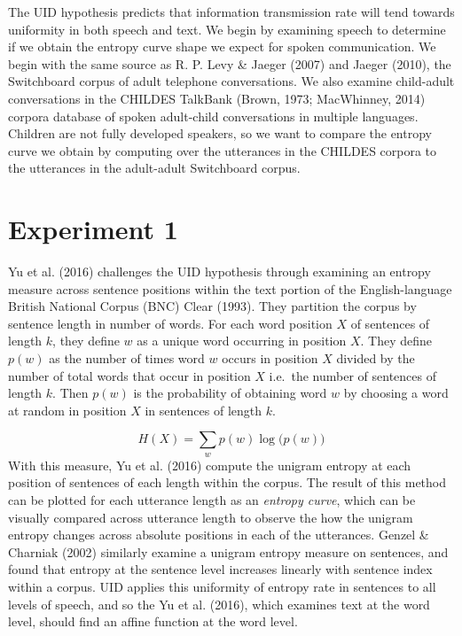 \documentclass[10pt, letterpaper]{article}
\begin{document}
The UID hypothesis predicts that information transmission rate will tend
towards uniformity in both speech and text. We begin by examining speech
to determine if we obtain the entropy curve shape we expect for spoken
communication. We begin with the same source as R. P. Levy \& Jaeger
(2007) and Jaeger (2010), the Switchboard corpus of adult telephone
conversations. We also examine child-adult conversations in the CHILDES
TalkBank (Brown, 1973; MacWhinney, 2014) corpora database of spoken
adult-child conversations in multiple languages. Children are not fully
developed speakers, so we want to compare the entropy curve we obtain by
computing over the utterances in the CHILDES corpora to the utterances
in the adult-adult Switchboard corpus.

\section{Experiment 1}\label{experiment-1}

Yu et al. (2016) challenges the UID hypothesis through examining an
entropy measure across sentence positions within the text portion of the
English-language British National Corpus (BNC) Clear (1993). They
partition the corpus by sentence length in number of words. For each
word position \(X\) of sentences of length \(k\), they define \(w\) as a
unique word occurring in position \(X\). They define \(p(w)\) as the
number of times word \(w\) occurs in position \(X\) divided by the
number of total words that occur in position \(X\) i.e.~the number of
sentences of length \(k\). Then \(p(w)\) is the probability of obtaining
word \(w\) by choosing a word at random in position \(X\) in sentences
of length \(k\).

\[H(X) = \sum\limits_w p(w)\log\big(p(w)\big)\] With this measure, Yu et
al. (2016) compute the unigram entropy at each position of sentences of
each length within the corpus. The result of this method can be plotted
for each utterance length as an \emph{entropy curve}, which can be
visually compared across utterance length to observe the how the unigram
entropy changes across absolute positions in each of the utterances.
Genzel \& Charniak (2002) similarly examine a unigram entropy measure on
sentences, and found that entropy at the sentence level increases
linearly with sentence index within a corpus. UID applies this
uniformity of entropy rate in sentences to all levels of speech, and so
the Yu et al. (2016), which examines text at the word level, should find
an affine function at the word level.
\end{document}
